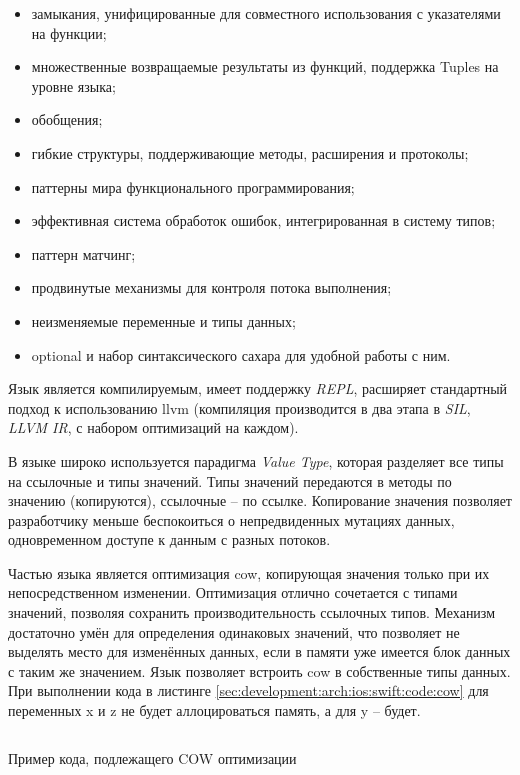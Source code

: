 \begin{itemize}
	\item замыкания, унифицированные для совместного использования с указателями на функции;
	\item множественные возвращаемые результаты из функций, поддержка Tuples на уровне языка;
	\item обобщения;
	\item гибкие структуры, поддерживающие методы, расширения и протоколы;
	\item паттерны мира функционального программирования;
	\item эффективная система обработок ошибок, интегрированная в систему типов;
	\item паттерн матчинг;
	\item продвинутые механизмы для контроля потока выполнения;
	\item неизменяемые переменные и типы данных;
	\item optional и набор синтаксического сахара для удобной работы с ним.
\end{itemize}

Язык является компилируемым, имеет поддержку \textit{REPL}, расширяет стандартный подход к использованию \gls{llvm} (компиляция производится в два этапа в \textit{SIL}, \textit{LLVM IR}, с набором оптимизаций на каждом).

В языке широко используется парадигма \textit{Value Type}, которая разделяет все типы на ссылочные и типы значений. Типы значений передаются в методы по значению (копируются), ссылочные -- по ссылке. Копирование значения позволяет разработчику меньше беспокоиться о непредвиденных мутациях данных, одновременном доступе к данным с разных потоков.

Частью языка является оптимизация \gls{cow}, копирующая значения только при их непосредственном изменении. Оптимизация отлично сочетается с типами значений, позволяя сохранить производительность ссылочных типов. Механизм достаточно умён для определения одинаковых значений, что позволяет не выделять место для изменённых данных, если в памяти уже имеется блок данных с таким же значением. Язык позволяет встроить \gls{cow} в собственные типы данных. При выполнении кода в листинге \ref{sec:development:arch:ios:swift:code:cow} для переменных x и z не будет аллоцироваться память, а для y -- будет.

\begin{code}
	\inputminted{swift}{inc/src/swift_cow_example.swift}
   \caption{Пример кода, подлежащего COW оптимизации}
   \label{sec:development:arch:ios:swift:code:cow}
\end{code}


